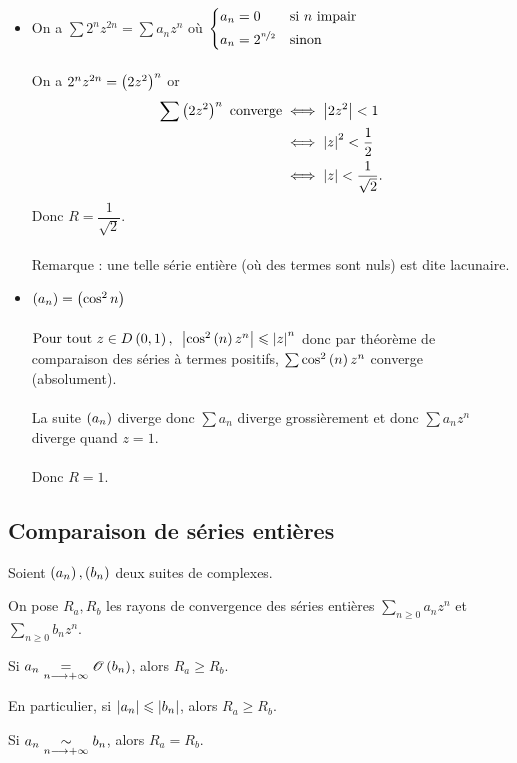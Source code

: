 \begin{corr}
\begin{itemize}
    \item On a \(\sum2^nz^{2n}=\sum a_nz^n\) où \(\begin{dcases}
        a_n=0 &\text{si }n\text{ impair} \\
        a_n=2^{\nicefrac{n}{2}} &\text{sinon}
    \end{dcases}\) \\\\ On a \(2^nz^{2n}=\left(2z^2\right)^n\) or \[\begin{aligned}
        \sum\left(2z^2\right)^n\text{ converge}&\iff\left\lvert2z^2\right\rvert<1 \\
        &\iff\left\lvert z\right\rvert^2<\dfrac{1}{2} \\
        &\iff\left\lvert z\right\rvert<\dfrac{1}{\sqrt{2}}.
    \end{aligned}\] Donc \(R=\dfrac{1}{\sqrt{2}}\). \\\\ Remarque : une telle série entière (où des termes sont nuls) est dite lacunaire. \\
    \item \(\left(a_n\right)=\left(\cos^2n\right)\) \\\\ \(\quantifs{\Tpt z\in\disqueo{0}{1}}\abs{\cos^2\paren{n}z^n}\leq\abs{z}^n\) donc par théorème de comparaison des séries à termes positifs, \(\sum\cos^2\left(n\right)z^n\) converge (absolument). \\\\ La suite \(\left(a_n\right)\) diverge donc \(\sum a_n\) diverge grossièrement et donc \(\sum a_nz^n\) diverge quand \(z=1\). \\\\ Donc \(R=1\).
\end{itemize}
\end{corr}

\subsection{Comparaison de séries entières}

\begin{prop}
Soient \(\left(a_n\right),\left(b_n\right)\) deux suites de complexes.

On pose \(R_a,R_b\) les rayons de convergence des séries entières \(\sum_{n\geq0}a_nz^n\) et \(\sum_{n\geq0}b_nz^n\).

Si \(a_n\underset{n\longrightarrow+\infty}{=}\mathscr{O}\left(b_n\right)\), alors \(R_a\geq R_b\).

En particulier, si \(\left\lvert a_n\right\rvert\leqslant\left\lvert b_n\right\rvert\), alors \(R_a\geq R_b\).

Si \(a_n\underset{n\longrightarrow+\infty}{\sim}b_n\), alors \(R_a=R_b\).
\end{prop}

